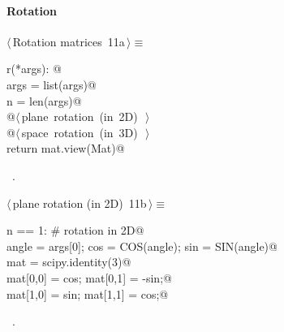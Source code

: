 \documentclass[11pt,oneside]{article}	%
\begin{document}
\paragraph{Rotation}
\begin{flushleft} \small \label{scrap21}
\protect{}$\langle\,$Rotation matrices\nobreak\ {\footnotesize 11a}$\,\rangle\equiv$
\vspace{-1ex}
\begin{list}{}{} \item
\mbox{}\verb@def r(*args): @\\
\mbox{}\verb@   args = list(args)@\\
\mbox{}\verb@   n = len(args)@\\
\mbox{}\verb@   @\hbox{$\langle\,$plane rotation (in 2D)\nobreak\ {\footnotesize {}}$\,\rangle$}\verb@@\\
\mbox{}\verb@   @\hbox{$\langle\,$space rotation (in 3D)\nobreak\ {\footnotesize {}}$\,\rangle$}\verb@@\\
\mbox{}\verb@   return mat.view(Mat)@\\
\mbox{}\verb@@{\NWsep}
\end{list}
\vspace{-1ex}
\footnotesize\addtolength{\baselineskip}{-1ex}
\begin{list}{}{\setlength{\itemsep}{-\parsep}\setlength{\itemindent}{-\leftmargin}}
\item \NWtxtMacroRefIn\ .
\end{list}
\end{flushleft}
\begin{flushleft} \small \label{scrap22}
\protect{}$\langle\,$plane rotation (in 2D)\nobreak\ {\footnotesize 11b}$\,\rangle\equiv$
\vspace{-1ex}
\begin{list}{}{} \item
\mbox{}\verb@if n == 1: # rotation in 2D@\\
\mbox{}\verb@   angle = args[0]; cos = COS(angle); sin = SIN(angle)@\\
\mbox{}\verb@   mat = scipy.identity(3)@\\
\mbox{}\verb@   mat[0,0] = cos;   mat[0,1] = -sin;@\\
\mbox{}\verb@   mat[1,0] = sin;   mat[1,1] = cos;@\\
\mbox{}\verb@@{\NWsep}
\end{list}
\vspace{-1ex}
\footnotesize\addtolength{\baselineskip}{-1ex}
\begin{list}{}{\setlength{\itemsep}{-\parsep}\setlength{\itemindent}{-\leftmargin}}
\item \NWtxtMacroRefIn\ .
\end{list}
\end{flushleft}
\end{document}
